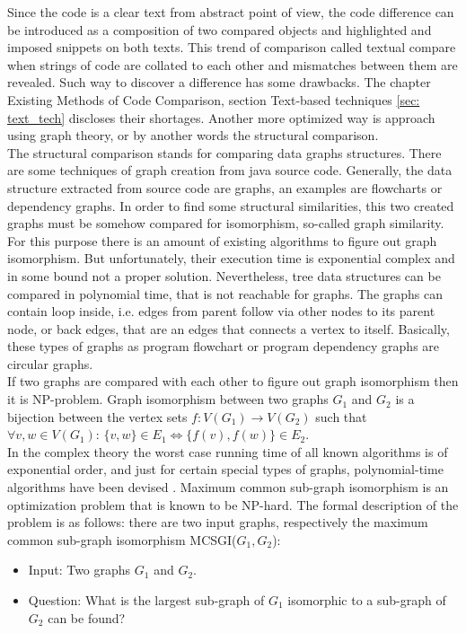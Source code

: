\documentclass{report}
\begin{document}
Since the code is a clear text from abstract point of view, the code difference can be introduced as a composition of two compared objects and highlighted and imposed snippets on both texts. This trend of comparison called textual compare when strings of code are collated to each other and mismatches between them are revealed. Such way to discover a difference has some drawbacks. The chapter Existing Methods of Code Comparison, section Text-based techniques \ref{sec: text_tech} discloses their shortages. Another more optimized way is approach using graph theory, or by another words the structural comparison.
\\
The structural comparison stands for comparing data graphs structures. There are some techniques of graph creation from java source code. Generally, the data structure extracted from source code are graphs, an examples are flowcharts or dependency graphs. In order to find some structural similarities, this two created graphs must be somehow compared for isomorphism, so-called graph similarity. For this purpose there is an amount of existing algorithms to figure out graph isomorphism. But unfortunately, their execution time is exponential complex and in some bound not a proper solution. Nevertheless, tree data structures can be compared in polynomial time, that is not reachable for graphs. The graphs can contain loop inside, i.e. edges from parent follow via other nodes to its parent node, or back edges, that are an edges that connects a vertex to itself. Basically, these types of graphs as program flowchart or program dependency graphs are circular graphs. 
\\
If two graphs are compared with each other to figure out graph isomorphism then it is NP-problem. Graph isomorphism between two graphs $G_{1}$ and $G_{2}$ is a bijection between the vertex sets $f: V(G_{1}) \rightarrow V(G_{2}) $ such that \\ $ \forall v, w \in V(G_{1})$:  $ \{v,w\} \in E_{1} \iff \{ f(v), f(w)\} \in E_{2}$. 
\\
In the complex theory the worst case running time of all known algorithms is of exponential order, and just for certain special types of graphs, polynomial-time algorithms have been devised \cite{graph_isomorphism_is}. Maximum common sub-graph isomorphism is an optimization problem that is known to be NP-hard. The formal description of the problem is as follows:
there are two input graphs, respectively the maximum common sub-graph isomorphism MCSGI($ G_{1}, G_{2}$):

\begin{itemize}
	\item     Input: Two graphs $ G_{1}$ and $G_{2}$.
	\item     Question: What is the largest sub-graph of  $ G_{1}$ isomorphic to a sub-graph of  $ G_{2}$ can be found?
\end{itemize}
\end{document}

